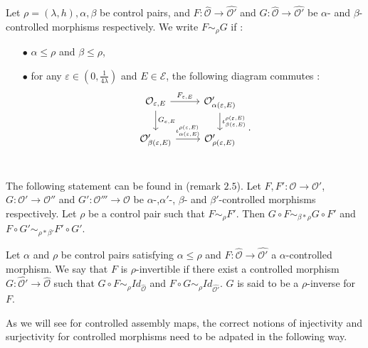 Let $\rho=(\lambda,h),\alpha,\beta$ be control pairs, and $F :  \hat{\mathcal O} \rightarrow \hat{\mathcal O'}$ and $G : \hat{\mathcal O} \rightarrow \hat{\mathcal O'}$ be $\alpha$- and $\beta$-controlled morphisms respectively. We write $F\sim_\rho G$ if :
\begin{itemize}%
\item[$\bullet$] $\alpha \leq \rho$ and $\beta \leq \rho$,
\item[$\bullet$] for any $\varepsilon\in (0,\frac{1}{4\lambda})$ and $E\in \mathcal E$, the following diagram commutes : 
\[\begin{tikzcd}
 \mathcal O_{\varepsilon,E} \arrow{r}{F_{\varepsilon,E}} \arrow{d}{G_{\varepsilon,E}} & \mathcal O'_{\alpha (\varepsilon,E) } 
\arrow{d}{\iota_{\beta(\varepsilon,E)}^{\rho(\varepsilon,E)}} \\
 \mathcal O'_{\beta (\varepsilon,E) } \arrow{r}{\iota_{\alpha(\varepsilon,E)}^{\rho(\varepsilon,E)}} & \mathcal O'_{\rho(\varepsilon,E)}\\
\end{tikzcd}.\]
\end{itemize}

\begin{rk} \label{rk2.5} The following statement can be found in \cite{OY2} (remark $2.5$). Let $F,F' : \mathcal O\rightarrow \mathcal O'$, $G: \mathcal O'\rightarrow \mathcal O''$ and $G': \mathcal O'''\rightarrow \mathcal O$ be $\alpha$-,$\alpha'$-, $\beta$- and $\beta'$-controlled morphisms respectively. Let $\rho $ be a control pair such that $F\sim_\rho F'$. Then $G\circ F \sim_{\beta\ast\rho}  G\circ F'$ and $F\circ G'\sim_{\rho \ast \beta'} F'\circ G'$.
\end{rk}

\begin{definition}
Let $\alpha$ and $\rho$ be control pairs satisfying $\alpha \leq \rho$ and $F : \hat{\mathcal O} \rightarrow \hat{\mathcal O'}$ a $\alpha$-controlled morphism. We say that $F$ is $\rho$-invertible if there exist a controlled morphism $ G : \hat{\mathcal O'} \rightarrow \hat{\mathcal O}$ such that $G \circ F \sim_\rho Id_{\hat{\mathcal O}}$ and $F\circ G \sim_\rho Id_{\hat{\mathcal O'}}$. $G$ is said to be a $\rho$-inverse for $F$.
\end{definition}

As we will see for controlled assembly maps, the correct notions of injectivity and surjectivity for controlled morphisms need to be adpated in the following way.\\

